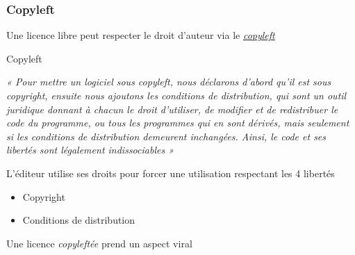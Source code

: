 \documentclass[10pt]{beamer}
\begin{document}
\begin{frame}
  \frametitle{Copyleft \textcopyleft}

  Une licence libre peut respecter le droit d'auteur via le
  \emph{\href{https://fr.wikipedia.org/wiki/Copyleft}{copyleft}}

  \begin{block}{Copyleft}

    \slshape « Pour mettre un logiciel sous copyleft, nous déclarons d'abord
    qu'il est sous copyright, ensuite nous ajoutons les conditions de
    distribution, qui sont un outil juridique donnant à chacun le droit
    d'utiliser, de modifier et de redistribuer le code du programme, ou tous
    les programmes qui en sont dérivés, mais seulement si les conditions de
    distribution demeurent inchangées. Ainsi, le code et ses libertés sont
    légalement indissociables »
  \end{block}

  \vfill

  L'éditeur utilise ses droits pour forcer une utilisation respectant les 4
  libertés

  \begin{itemize}
  \item Copyright
  \item Conditions de distribution
  \end{itemize}

  \begin{center}
    Une licence \emph{copyleftée} prend un \alert{aspect viral}
  \end{center}
\end{frame}

\end{document}
